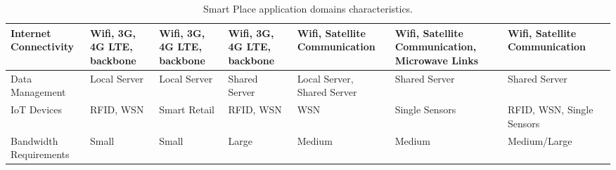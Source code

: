 \begin{landscape}
\begin{table}[p]
\begin{adjustbox}{width=\textwidth}
\begin{tabular}{*{14}{l}}
      Internet Connectivity  & \multicolumn{2}{p{\colWidth}}{\raggedright Wifi, 3G, 4G LTE, backbone} & \multicolumn{2}{p{\colWidth}}{\raggedright Wifi, 3G, 4G LTE, backbone} & \multicolumn{2}{p{\colWidth}}{\raggedright Wifi, 3G, 4G LTE, backbone}              & \multicolumn{2}{p{\colWidth}}{\raggedright Wifi, Satellite Communication}     & \multicolumn{2}{p{\colWidth}}{\raggedright Wifi, Satellite Communication, Microwave Links}   & \multicolumn{2}{p{\colWidth}}{\raggedright Wifi, Satellite Communication}            \\ \midrule
      Data Management        & \multicolumn{2}{p{\colWidth}}{\raggedright Local Server}               & \multicolumn{2}{p{\colWidth}}{\raggedright Local Server}               & \multicolumn{2}{p{\colWidth}}{\raggedright Shared Server}                           & \multicolumn{2}{p{\colWidth}}{\raggedright Local Server, Shared Server}       & \multicolumn{2}{p{\colWidth}}{\raggedright Shared Server}                                    & \multicolumn{2}{p{\colWidth}}{\raggedright Shared Server}                            \\ \midrule
      IoT Devices            & \multicolumn{2}{p{\colWidth}}{\raggedright RFID, WSN}                  & \multicolumn{2}{p{\colWidth}}{\raggedright Smart Retail}               & \multicolumn{2}{p{\colWidth}}{\raggedright RFID, WSN}                               & \multicolumn{2}{p{\colWidth}}{\raggedright WSN}                               & \multicolumn{2}{p{\colWidth}}{\raggedright Single Sensors}                                   & \multicolumn{2}{p{\colWidth}}{\raggedright RFID, WSN, Single Sensors}                \\ \midrule
      Bandwidth Requirements & \multicolumn{2}{p{\colWidth}}{\raggedright Small}                      & \multicolumn{2}{p{\colWidth}}{\raggedright Small}                      & \multicolumn{2}{p{\colWidth}}{\raggedright Large}                                   & \multicolumn{2}{p{\colWidth}}{\raggedright Medium}                            & \multicolumn{2}{p{\colWidth}}{\raggedright Medium}                                           & \multicolumn{2}{p{\colWidth}}{\raggedright Medium/Large}                             \\
      \bottomrule
      \end{tabular}
    \end{adjustbox}
    \caption{Smart Place application domains characteristics.}
    \label{table:smart_places_characteristics}
  \end{table}
\end{landscape}
